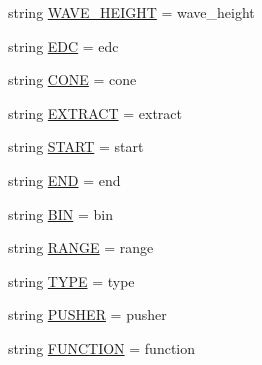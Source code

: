 \begin{DoxyCompactItemize}
\item 
string \hyperlink{namespace_uni_dec_1_1unidec__modules_1_1tims__import__wizard_1_1_tag_types_ab2a44fe0e94265855aa1336efe83bfa0}{W\+A\+V\+E\+\_\+\+H\+E\+I\+G\+H\+T} = \textquotesingle{}wave\+\_\+height\textquotesingle{}
\item 
string \hyperlink{namespace_uni_dec_1_1unidec__modules_1_1tims__import__wizard_1_1_tag_types_a6b7e18a11f945f35c1effb7ee8708f2d}{E\+D\+C} = \textquotesingle{}edc\textquotesingle{}
\item 
string \hyperlink{namespace_uni_dec_1_1unidec__modules_1_1tims__import__wizard_1_1_tag_types_abcf2b338f19ead998c9dc71be3cccce5}{C\+O\+N\+E} = \textquotesingle{}cone\textquotesingle{}
\item 
string \hyperlink{namespace_uni_dec_1_1unidec__modules_1_1tims__import__wizard_1_1_tag_types_a63431141f7de7fb672d1a4d229eedcbe}{E\+X\+T\+R\+A\+C\+T} = \textquotesingle{}extract\textquotesingle{}
\item 
string \hyperlink{namespace_uni_dec_1_1unidec__modules_1_1tims__import__wizard_1_1_tag_types_a9c7916d3c9db3583dae3cf368de284c9}{S\+T\+A\+R\+T} = \textquotesingle{}start\textquotesingle{}
\item 
string \hyperlink{namespace_uni_dec_1_1unidec__modules_1_1tims__import__wizard_1_1_tag_types_a5ab0ed8dfd7bbf350c1a18383673b05e}{E\+N\+D} = \textquotesingle{}end\textquotesingle{}
\item 
string \hyperlink{namespace_uni_dec_1_1unidec__modules_1_1tims__import__wizard_1_1_tag_types_ad350e4df9b7396ce0729f006c27df787}{B\+I\+N} = \textquotesingle{}bin\textquotesingle{}
\item 
string \hyperlink{namespace_uni_dec_1_1unidec__modules_1_1tims__import__wizard_1_1_tag_types_aa659b0ed1ea34ff10b65aa2c74f0d50f}{R\+A\+N\+G\+E} = \textquotesingle{}range\textquotesingle{}
\item 
string \hyperlink{namespace_uni_dec_1_1unidec__modules_1_1tims__import__wizard_1_1_tag_types_abd7799fc0d6d540ef2680f8efa1c4c3a}{T\+Y\+P\+E} = \textquotesingle{}type\textquotesingle{}
\item 
string \hyperlink{namespace_uni_dec_1_1unidec__modules_1_1tims__import__wizard_1_1_tag_types_a507c6ceb78463ddb0bb4f1e187fea442}{P\+U\+S\+H\+E\+R} = \textquotesingle{}pusher\textquotesingle{}
\item 
string \hyperlink{namespace_uni_dec_1_1unidec__modules_1_1tims__import__wizard_1_1_tag_types_aed082c38c4099e006219e554c24c12e2}{F\+U\+N\+C\+T\+I\+O\+N} = \textquotesingle{}function\textquotesingle{}
\item 

\end{DoxyCompactItemize}
